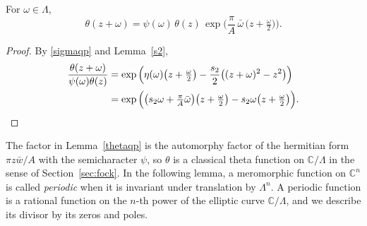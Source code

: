 \begin{lemma}\label{thetaqp}
For $\omega\in\Lambda$,
\[
\theta(z+\omega)=\psi(\omega)\,\theta(z)\,\exp\Big(\frac\pi A\,\bar\omega\,\big(z+\tfrac\omega2\big)\Big).
\]
\end{lemma}

\begin{proof}
By \eqref{sigmaqp} and Lemma~\ref{s2},
\begin{align*}
\frac{\theta(z+\omega)}{\psi(\omega)\theta(z)}&=\exp\Big(\eta(\omega)\big(z+\tfrac\omega2\big)-\frac{s_2}2\big((z+\omega)^2-z^2\big)\Big)\\
&=\exp\Big(\big(s_2\omega+\tfrac\pi A\bar\omega\big)\big(z+\tfrac\omega2\big)-s_2\omega\big(z+\tfrac\omega2\big)\Big).\qedhere
\end{align*}
\end{proof}

The factor in Lemma~\ref{thetaqp} is the automorphy factor of the hermitian form $\pi z\bar w/A$ with the semicharacter $\psi$, so $\theta$ is a classical theta function on $\mathbb C/\Lambda$ in the sense of Section~\ref{sec:fock}. In the following lemma, a meromorphic function on $\mathbb C^n$ is called \emph{periodic} when it is invariant under translation by $\Lambda^n$. A periodic function is a rational function on the $n$-th power of the elliptic curve $\mathbb C/\Lambda$, and we describe its divisor by its zeros and poles.

